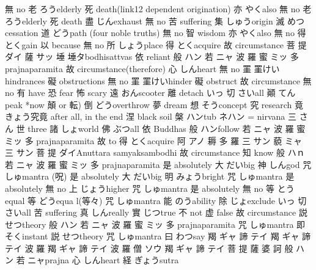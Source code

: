 {無}	{}{no}
{老}	{ろう}{elderly}
{死}	{}{death(link12 dependent origination)}
{亦}	{やく}{also}
{無}	{}{no}
{老}	{ろう}{elderly}
{死}	{}{death}
{盡}	{じん}{exhaust}
{無}	{}{no}
{苦}	{}{suffering}
{集}	{しゅう}{origin}
{滅}	{めつ}{cessation}
{道}	{どう}{path (four noble truths)}
{無}	{}{no}
{智}	{}{wisdom}
{亦}	{やく}{also}
{無}	{}{no}
{得}	{とく}{gain}
{以}	{}{because}
{無}	{}{no}
{所}	{しょう}{place}
{得}	{とく}{acquire}
{故}	{}{circumstance}
{菩}	{}{}
{提}	{ダイ}{}
{薩}	{サッ}{}
{\textsf{埵}}	{\textsf{埵}}{タ}{bodhisattvas} %
{依}	{}{reliant}
{般}	{ハン}{}
{若}	{ニャ}{}
{波}	{}{}
{羅}	{}{}
{蜜}	{ミッ}{}
{多}	{}{prajnaparamita}
{故}	{}{circumstance(therefore)}
{心}	{しん}{heart}
{無}	{}{no}
{\textsf{罣}}	{\textsf{罣}}{けい}{hindrances}%
{礙}	{}{obstructions}
{無}	{}{no}
{\textsf{罣}}	{\textsf{罣}}{けい}{hinder}%
{礙}	{}{obstruct}
{故}	{}{circumstance}
{無}	{}{no}
{有}	{}{have}
{恐}	{}{fear}
{怖}	{}{scary}
{遠}	{おん}{scooter}
{離}	{}{detach}
{\stick}	{いっ}{}
{切}	{さい}{all}
{顚}	{てん}{peak *now 顛 or 転)}
{倒}	{どう}{overthrow}
{夢}	{}{dream}
{想}	{そう}{concept}
{究}	{}{research}
{竟}	{きょう}{究竟 after all, in the end}
{涅}	{}{black soil}
{槃}	{ハン}{tub ネハン = nirvana}
{三}	{さん}{}
{世}	{}{three}
{諸}	{しょ}{world}
{佛}	{ぶつ}{all}
{依}	{}{Buddhas}
{般}	{ハン}{follow}
{若}	{ニャ}{}
{波}	{}{}
{羅}	{}{}
{蜜}	{ミッ}{}
{多}	{}{prajnaparamita}
{故}	{}{to}
{得}	{とく}{acquire}
{阿}	{アノ}{}
{耨}	{}{}
{多}	{}{}
{羅}	{}{}
{三}	{サン}{}
{藐}	{ミャ}{}
{三}	{サン}{}
{菩}	{}{}
{提}	{ダイ}{Anuttara samyaksambodhi}
{故}	{}{circumstance}
{知}	{}{know}
{般}	{ハｎ}{}
{若}	{ニャ}{}
{波}	{}{}
{羅}	{}{}
{蜜}	{ミッ}{}
{多}	{}{prajnaparamita}
{是}	{}{absolutely}
{大}	{だい}{big}
{神}	{しん}{god}
{咒}	{しゅ}{mantra (呪)}
{是}	{}{absolutely}
{大}	{だい}{big}
{明}	{みょう}{bright}
{咒}	{しゅ}{mantra}
{是}	{}{absolutely}
{無}	{}{no}
{上}	{じょう}{higher}
{咒}	{しゅ}{mantra}
{是}	{}{absolutely}
{無}	{}{no}
{等}	{とう}{equal}
{等}	{どう}{equa l(等々)}
{咒}	{しゅ}{mantra}
{能}	{のう}{ability}
{除}	{じょ}{exclude}
{\stick}	{いっ}{}
{切}	{さい}{all}
{苦}	{}{suffering}
{真}	{しん}{really}
{實}	{じつ}{true}
{不}	{}{not}
{虚}	{}{false}
{故}	{}{circumstance}
{説}	{せつ}{theory}
{般}	{ハン}{}
{若}	{ニャ}{}
{波}	{}{}
{羅}	{}{}
{蜜}	{ミッ}{}
{多}	{}{prajnaparamita}
{咒}	{しゅ}{mantra}
{即}	{そく}{instant}
{説}	{せつ}{theory}
{咒}	{しゅ}{mantra}
{曰}	{わつ}{say}
{羯}	{ギャ}{}
{諦}	{テイ}{}
{羯}	{ギャ}{}
{諦}	{テイ}{}
{波}	{}{}
{羅}	{}{}
{羯}	{ギャ}{}
{諦}	{テイ}{}
{波}	{}{}
{羅}	{}{}
{僧}	{ソウ}{}
{羯}	{ギャ}{}
{諦}	{テイ}{}
{菩}	{}{}
{提}	{}{}
{薩}	{}{}
{婆}	{}{}
{訶}	{}{}
{般}	{ハン}{}
{若}	{ニャ}{prajna}
{心}	{しん}{heart}
{経}	{ぎょう}{sutra}
	
